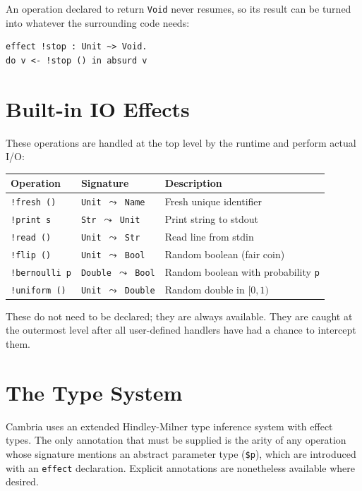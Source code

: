 \documentclass[11pt,a4paper]{article}
\newcommand{\cba}[1]{\lstinline[style=cbainline]{#1}}
\begin{document}
An operation declared to return \texttt{Void} never resumes, so its result
can be turned into whatever the surrounding code needs:

\begin{lstlisting}
effect !stop : Unit ~> Void.
do v <- !stop () in absurd v
\end{lstlisting}

\section{Built-in IO Effects}
\label{sec:builtinio}

These operations are handled at the top level by the runtime and perform actual
I/O:

\begin{center}
\begin{tabular}{lll}
\toprule
\textbf{Operation} & \textbf{Signature} & \textbf{Description} \\
\midrule
\texttt{!fresh ()}    & \texttt{Unit $\leadsto$ Name}    & Fresh unique identifier \\
\texttt{!print s}      & \texttt{Str $\leadsto$ Unit}       & Print string to stdout \\
\texttt{!read ()}      & \texttt{Unit $\leadsto$ Str}       & Read line from stdin \\
\texttt{!flip ()}      & \texttt{Unit $\leadsto$ Bool}      & Random boolean (fair coin) \\
\texttt{!bernoulli p}  & \texttt{Double $\leadsto$ Bool}    & Random boolean with probability \texttt{p} \\
\texttt{!uniform ()}   & \texttt{Unit $\leadsto$ Double}    & Random double in $[0, 1)$ \\
\bottomrule
\end{tabular}
\end{center}

These do not need to be declared; they are always available.  They are
caught at the outermost level after all user-defined handlers have had a
chance to intercept them.

\section{The Type System}
\label{sec:typesystem}

Cambria uses an extended Hindley-Milner type inference system with effect types.
The only annotation that must be supplied is the arity of any operation whose signature mentions an abstract parameter type (\texttt{\$p}),
which are introduced with an \cba{effect} declaration.
Explicit annotations are nonetheless available where desired.
\end{document}
